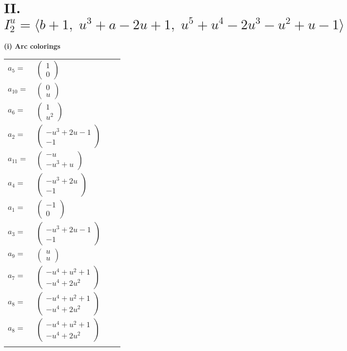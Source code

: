 \documentclass[1p]{elsarticle_modified}
\theoremstyle{definition}
\begin{document}
\centering \section*{II. $I^u_{2}= \langle b+1,\;u^3+a-2 u+1,\;u^5+u^4-2 u^3- u^2+u-1 \rangle$}
\flushleft \textbf{(i) Arc colorings}\\
\begin{tabular}{m{7pt} m{180pt} m{7pt} m{180pt} }
\flushright $a_{5}=$&$\begin{pmatrix}1\\0\end{pmatrix}$ \\
\flushright $a_{10}=$&$\begin{pmatrix}0\\u\end{pmatrix}$ \\
\flushright $a_{6}=$&$\begin{pmatrix}1\\u^2\end{pmatrix}$ \\
\flushright $a_{2}=$&$\begin{pmatrix}- u^3+2 u-1\\-1\end{pmatrix}$ \\
\flushright $a_{11}=$&$\begin{pmatrix}- u\\- u^3+u\end{pmatrix}$ \\
\flushright $a_{4}=$&$\begin{pmatrix}- u^3+2 u\\-1\end{pmatrix}$ \\
\flushright $a_{1}=$&$\begin{pmatrix}-1\\0\end{pmatrix}$ \\
\flushright $a_{3}=$&$\begin{pmatrix}- u^3+2 u-1\\-1\end{pmatrix}$ \\
\flushright $a_{9}=$&$\begin{pmatrix}u\\u\end{pmatrix}$ \\
\flushright $a_{7}=$&$\begin{pmatrix}- u^4+u^2+1\\- u^4+2 u^2\end{pmatrix}$ \\
\flushright $a_{8}=$&$\begin{pmatrix}- u^4+u^2+1\\- u^4+2 u^2\end{pmatrix}$\\ \flushright $a_{8}=$&$\begin{pmatrix}- u^4+u^2+1\\- u^4+2 u^2\end{pmatrix}$\\&\end{tabular}
\end{document}
